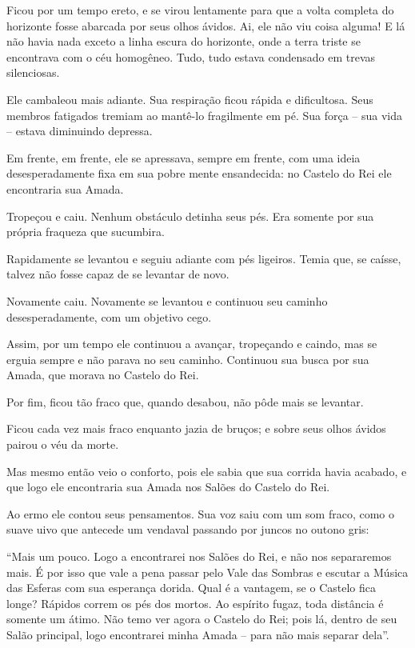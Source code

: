 Ficou por um tempo ereto, e se virou lentamente para que a volta
completa do horizonte fosse abarcada por seus olhos ávidos. Ai, ele não
viu coisa alguma! E lá não havia nada exceto a linha escura do
horizonte, onde a terra triste se encontrava com o céu homogêneo. Tudo,
tudo estava condensado em trevas silenciosas.

Ele cambaleou mais adiante. Sua respiração ficou rápida e dificultosa.
Seus membros fatigados tremiam ao mantê-lo fragilmente em pé. Sua força
-- sua vida -- estava diminuindo depressa.

Em frente, em frente, ele se apressava, sempre em frente, com uma ideia
desesperadamente fixa em sua pobre mente ensandecida: no Castelo do Rei
ele encontraria sua Amada.

Tropeçou e caiu. Nenhum obstáculo detinha seus pés. Era somente por sua
própria fraqueza que sucumbira.

Rapidamente se levantou e seguiu adiante com pés ligeiros. Temia que, se
caísse, talvez não fosse capaz de se levantar de novo.

Novamente caiu. Novamente se levantou e continuou seu caminho
desesperadamente, com um objetivo cego.

Assim, por um tempo ele continuou a avançar, tropeçando e caindo, mas se
erguia sempre e não parava no seu caminho. Continuou sua busca por sua
Amada, que morava no Castelo do Rei.

Por fim, ficou tão fraco que, quando desabou, não pôde mais se levantar.

Ficou cada vez mais fraco enquanto jazia de bruços; e sobre seus olhos
ávidos pairou o véu da morte.

Mas mesmo então veio o conforto, pois ele sabia que sua corrida havia
acabado, e que logo ele encontraria sua Amada nos Salões do Castelo do
Rei.

Ao ermo ele contou seus pensamentos. Sua voz saiu com um som fraco, como
o suave uivo que antecede um vendaval passando por juncos no outono
gris:

``Mais um pouco. Logo a encontrarei nos Salões do Rei, e não nos
separaremos mais. É por isso que vale a pena passar pelo Vale das
Sombras e escutar a Música das Esferas com sua esperança dorida. Qual é
a vantagem, se o Castelo fica longe? Rápidos correm os pés dos mortos.
Ao espírito fugaz, toda distância é somente um átimo. Não temo ver agora
o Castelo do Rei; pois lá, dentro de seu Salão principal, logo
encontrarei minha Amada -- para não mais separar dela''.

